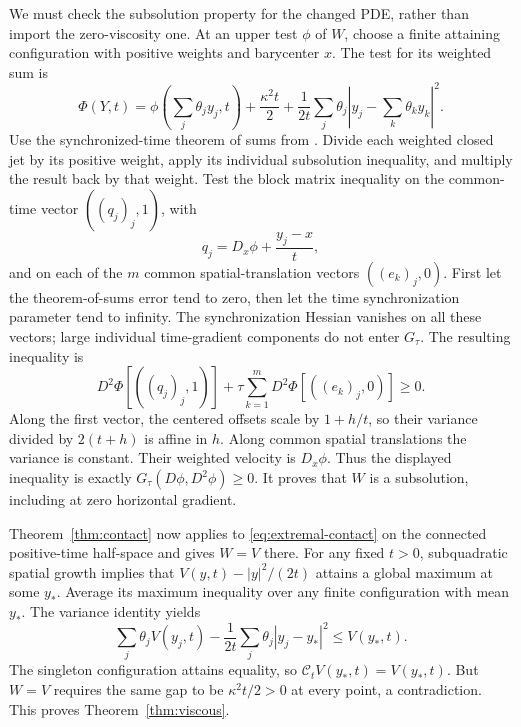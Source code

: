 We must check the subsolution property for the changed PDE, rather
than import the zero-viscosity one. At an upper test $\phi$ of $W$,
choose a finite attaining configuration with positive weights and
barycenter $x$. The test for its weighted sum is
\[
 \Phi(Y,t)=\phi\left(\sum_j\theta_jy_j,t\right)
       +\frac{\kappa^2t}{2}
       +\frac1{2t}\sum_j\theta_j
                   \left|y_j-\sum_k\theta_ky_k\right|^2.
\]
Use the synchronized-time theorem of sums from
\cite[Sections 2 and 5]{OpenAI}. Divide each weighted closed jet by
its positive weight, apply its individual subsolution inequality,
and multiply the result back by that weight. Test the block matrix
inequality on the common-time vector $((q_j)_j,1)$, with
\[
 q_j=D_x\phi+\frac{y_j-x}{t},
\]
and on each of the $m$ common spatial-translation vectors
$((e_k)_j,0)$. First let the theorem-of-sums error tend to zero,
then let the time synchronization parameter tend to infinity. The
synchronization Hessian vanishes on all these vectors; large
individual time-gradient components do not enter $G_\tau$. The
resulting inequality is
\[
 D^2\Phi[((q_j)_j,1)]
       +\tau\sum_{k=1}^mD^2\Phi[((e_k)_j,0)]\geq0.
\]
Along the first vector, the centered offsets scale by $1+h/t$,
so their variance divided by $2(t+h)$ is affine in $h$. Along
common spatial translations the variance is constant. Their weighted
velocity is $D_x\phi$. Thus the displayed inequality is exactly
$G_\tau(D\phi,D^2\phi)\geq0$. It proves that $W$ is a subsolution,
including at zero horizontal gradient.

Theorem~\ref{thm:contact} now applies to \eqref{eq:extremal-contact}
on the connected positive-time half-space and gives $W=V$ there.
For any fixed $t>0$, subquadratic spatial growth implies that
$V(y,t)-|y|^2/(2t)$ attains a global maximum at some $y_*$. Average
its maximum inequality over any finite configuration with mean
$y_*$. The variance identity yields
\[
 \sum_j\theta_jV(y_j,t)
      -\frac1{2t}\sum_j\theta_j|y_j-y_*|^2\leq V(y_*,t).
\]
The singleton configuration attains equality, so
$\mathcal C_tV(y_*,t)=V(y_*,t)$. But $W=V$ requires the same gap to
be $\kappa^2t/2>0$ at every point, a contradiction. This proves
Theorem~\ref{thm:viscous}.
